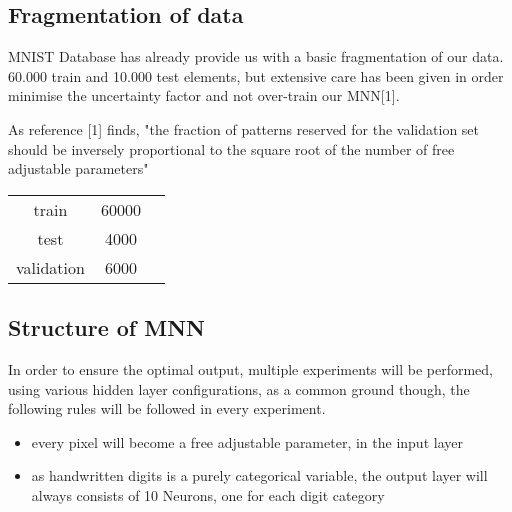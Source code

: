 \documentclass{proc}
\begin{document}
	\subsection{Fragmentation of data}
	MNIST Database has already provide us with a basic fragmentation of our data. 60.000 train and 10.000 test elements, but extensive care has been given in order minimise the uncertainty factor and not over-train our MNN[1].
	
	As reference [1] finds, "the fraction of patterns reserved for the
	validation set should be inversely proportional to the square root of the number of free adjustable
	parameters"
	\begin{tabular}{ccc}
		train&                    60000&                     	\\ 
		test&                     4000&                  		\\
		validation&               6000							
	\end{tabular}

	\subsection{Structure of MNN}
	In order to ensure the optimal output, multiple experiments will be performed, using various hidden layer configurations, as a common ground though, the following rules will be followed in every experiment.
	
	
	\begin{itemize}
		\item every pixel will become a free adjustable parameter, in the input layer
		\item as handwritten digits is a purely categorical variable, the output layer will always consists of 10 Neurons, one for each digit category
	\end{itemize}
	
\end{document}
